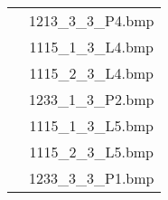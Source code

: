 \begin{table}
\begin{tabular}{ | c | c | }
                          & 1213\_3\_3\_P4.bmp \\
                          & 1115\_1\_3\_L4.bmp \\
                          & 1115\_2\_3\_L4.bmp \\
                          & 1233\_1\_3\_P2.bmp \\
                          & 1115\_1\_3\_L5.bmp \\
                          & 1115\_2\_3\_L5.bmp \\
                          & 1233\_3\_3\_P1.bmp  \\
      \hline
    \end{tabular}
  \end{table}






